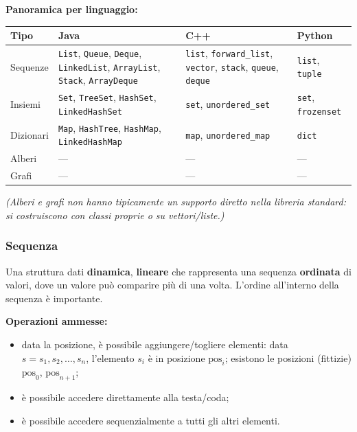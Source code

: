 \documentclass[12pt, a4paper]{article}
\begin{document}
\textbf{Panoramica per linguaggio:}
\begin{center}
\small
\begin{tabular}{lp{3.3cm}p{3.3cm}p{2.4cm}}
\toprule
\textbf{Tipo} & \textbf{Java} & \textbf{C++} & \textbf{Python} \\
\midrule
Sequenze & \texttt{List}, \texttt{Queue}, \texttt{Deque}, \texttt{LinkedList}, \texttt{ArrayList}, \texttt{Stack}, \texttt{ArrayDeque} & \texttt{list}, \texttt{forward\_list}, \texttt{vector}, \texttt{stack}, \texttt{queue}, \texttt{deque} & \texttt{list}, \texttt{tuple} \\
Insiemi & \texttt{Set}, \texttt{TreeSet}, \texttt{HashSet}, \texttt{LinkedHashSet} & \texttt{set}, \texttt{unordered\_set} & \texttt{set}, \texttt{frozenset} \\
Dizionari & \texttt{Map}, \texttt{HashTree}, \texttt{HashMap}, \texttt{LinkedHashMap} & \texttt{map}, \texttt{unordered\_map} & \texttt{dict} \\
Alberi & --- & --- & --- \\
Grafi & --- & --- & --- \\
\bottomrule
\end{tabular}
\end{center}
\textit{(Alberi e grafi non hanno tipicamente un supporto diretto nella libreria standard: si costruiscono con classi proprie o su vettori/liste.)}

\subsubsection{Sequenza}

\begin{tcolorbox}[colback=lightergray!10, colframe=tocsec, title=\textbf{Definizione: Sequenza}]
\label{def:sequenza}
Una struttura dati \textbf{dinamica}, \textbf{lineare} che rappresenta una sequenza \textbf{ordinata} di valori, dove un valore può comparire più di una volta. L'ordine all'interno della sequenza è importante.
\end{tcolorbox}

\textbf{Operazioni ammesse:}
\begin{itemize}
    \item data la posizione, è possibile aggiungere/togliere elementi: data $s=s_1,s_2,\ldots,s_n$, l'elemento $s_i$ è in posizione $\text{pos}_i$; esistono le posizioni (fittizie) $\text{pos}_0$, $\text{pos}_{n+1}$;
    \item è possibile accedere direttamente alla testa/coda;
    \item è possibile accedere sequenzialmente a tutti gli altri elementi.
\end{itemize}
\end{document}
